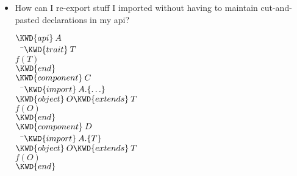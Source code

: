 \begin{itemize}
\item How can I re-export stuff I
imported without having to maintain cut-and-pasted declarations in my api?



\begin{Fortress}
\(\KWD{api}\:A\)\\
{\tt~~}\pushtabs\=\+\(  \KWD{trait}\:T\)\\
\(  f(T)\)\-\\\poptabs
\(\KWD{end}\)\\[4pt]
\(\KWD{component}\:C\)\\
{\tt~~}\pushtabs\=\+\(  \KWD{import}\:A.\{\ldots\}\)\\
\(  \KWD{object}\:O \KWD{extends}\:T\)\\
\(  f(O)\)\-\\\poptabs
\(\KWD{end}\)\\[4pt]
\(\KWD{component}\:D\)\\
{\tt~~}\pushtabs\=\+\(  \KWD{import}\:A.\{T\}\)\\
\(  \KWD{object}\:O \KWD{extends}\:T\)\\
\(  f(O)\)\-\\\poptabs
\(\KWD{end}\)
\end{Fortress}

\end{itemize}

